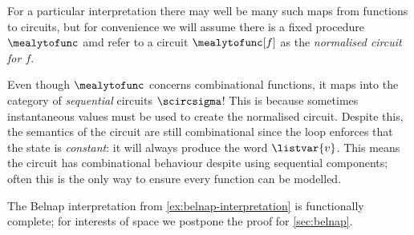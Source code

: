 For a particular interpretation there may well be many such maps from functions
to circuits, but for convenience we will assume there is a fixed procedure
\(\mealytofunc\) amd refer to a circuit \(\mealytofunc[f]\) as the
\emph{normalised circuit for \(f\)}.\

\begin{remark}
    Even though \(\mealytofunc\) concerns combinational functions, it maps into
    the category of \emph{sequential} circuits \(\scircsigma\)!
    This is because sometimes instantaneous values must be used to create the
    normalised circuit.
    Despite this, the semantics of the circuit are still combinational since the
    loop enforces that the state is \emph{constant}: it will always produce the
    word \(\listvar{v}\).
    This means the circuit has combinational behaviour despite using sequential
    components; often this is the only way to ensure every function can be
    modelled.
\end{remark}

\begin{example}
    The Belnap interpretation from \cref{ex:belnap-interpretation} is
    functionally complete; for interests of space we postpone the proof for
    \cref{sec:belnap}.
\end{example}
